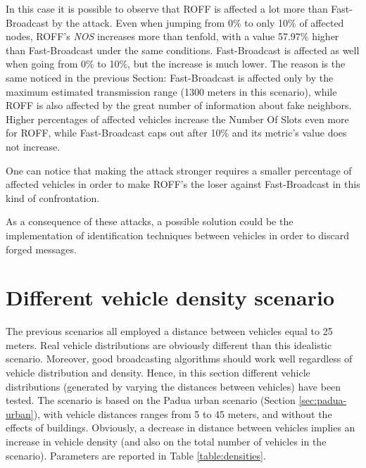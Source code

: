			In this case it is possible to observe that ROFF is affected a lot more than Fast-Broadcast by the attack. Even when jumping from 0\% to only 10\% of affected nodes, ROFF's \textit{NOS} increases more than tenfold, with a value 57.97\% higher than Fast-Broadcast under the same conditions. Fast-Broadcast is affected as well when going from 0\% to 10\%, but the increase is much lower. The reason is the same noticed in the previous Section: Fast-Broadcast is affected only by the maximum estimated transmission range (1300 meters in this scenario), while ROFF is also affected by the great number of information about fake neighbors. Higher percentages of affected vehicles increase the Number Of Slots even more for ROFF, while Fast-Broadcast caps out after 10\% and its metric's value does not increase.
			
			
			One can notice that making the attack stronger requires a smaller percentage of affected vehicles in order to make ROFF's the loser against Fast-Broadcast in this kind of confrontation. 
			
			
			As a consequence of these attacks, a possible solution could be the implementation of identification techniques between vehicles in order to discard forged messages.
	
	\section{Different vehicle density scenario}
		The previous scenarios all employed a distance between vehicles equal to 25 meters. Real vehicle distributions are obviously different than this idealistic scenario. Moreover, good broadcasting algorithms should work well regardless of vehicle distribution and density. Hence, in this section different vehicle distributions (generated by varying the distances between vehicles) have been tested. The scenario is based on the Padua urban scenario (Section \ref{sec:padua-urban}), with vehicle distances ranges from 5 to 45 meters, and without the effects of buildings. Obviously, a decrease in distance between vehicles implies an increase in vehicle density (and also on the total number of vehicles in the scenario). Parameters are reported in Table \ref{table:densities}.
		
